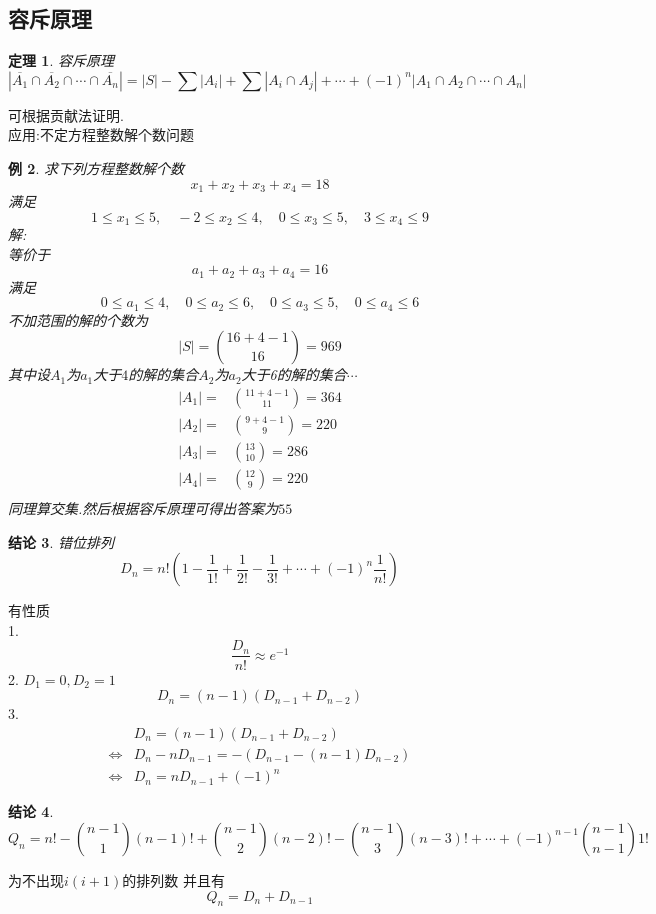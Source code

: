 \documentclass[12pt, a4paper, oneside]{ctexbook}
\newtheorem{theorem}{定理}[section]
\newtheorem{example}[theorem]{例}
\newtheorem{proposition}[theorem]{结论}
\begin{document}
\subsection{容斥原理}
\begin{theorem}
容斥原理
$$
|\overline{A_1}\cap \overline{A_2} \cap \cdots \cap \overline{A_n}|=|S|-\sum|A_i|+\sum|A_i\cap A_j|+\cdots+(-1)^n|A_1\cap A_2\cap \cdots \cap A_n|
$$
\end{theorem}
可根据贡献法证明.\\
应用:不定方程整数解个数问题
\begin{example}
  求下列方程整数解个数
  $$
  x_1+x_2+x_3+x_4=18
  $$
  满足
  $$
  1\leq x_1 \leq 5 ,\quad -2\leq x_2\leq4,\quad0\leq x_3\leq 5,\quad 3\leq x_4\leq 9
  $$
  解:\\
  等价于
  $$
  a_1+a_2+a_3+a_4=16
  $$
  满足
  $$
  0\leq a_1 \leq 4 ,\quad 0\leq a_2\leq6,\quad0\leq a_3\leq 5,\quad 0\leq a_4\leq 6
  $$
  不加范围的解的个数为
  $$
  |S|=\binom{16+4-1}{16}=969
  $$
  其中设$A_1$为$a_1$大于$4$的解的集合$A_2$为$a_2$大于6的解的集合$\cdots$
  $$
  \begin{aligned}
  |A_1|=&\binom{11+4-1}{11}=364\\
  |A_2|=&\binom{9+4-1}{9}=220\\
  |A_3|=&\binom{13}{10}=286\\
  |A_4|=&\binom{12}{9}=220\\
  \end{aligned}
  $$
  同理算交集.然后根据容斥原理可得出答案为$55$
\end{example}

\begin{proposition}
  错位排列
  $$
  D_n=n!\left(1-\frac{1}{1!}+\frac{1}{2!}-\frac{1}{3!}+\cdots+(-1)^n\frac{1}{n!}\right)
  $$
\end{proposition}
有性质\\
1.$$\frac{D_n}{n!}\approx e^{-1}$$
2.
$D_1=0,D_2=1$
$$
D_n=(n-1)(D_{n-1}+D_{n-2})
$$
3.
$$
\begin{aligned}
&D_n=(n-1)(D_{n-1}+D_{n-2})\\
\iff&D_n-nD_{n-1}=-(D_{n-1}-(n-1)D_{n-2})\\
\iff&D_n=nD_{n-1}+(-1)^n
\end{aligned}
$$

\begin{proposition}
$$ 
 Q_n=n!-\binom{n-1}{1}(n-1)!+\binom{n-1}{2}(n-2)!-\binom{n-1}{3}(n-3)!+\cdots+(-1)^{n-1}\binom{n-1}{n-1}1!
$$
\end{proposition}
为不出现$i(i+1)$的排列数
并且有
$$
Q_n=D_n+D_{n-1}
$$
\end{document}
